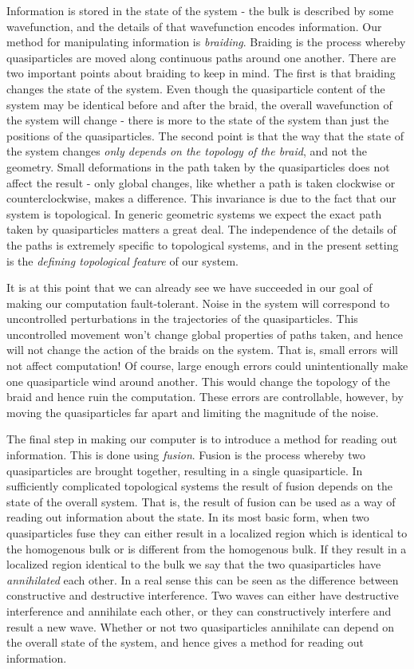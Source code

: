 \documentclass{article}
\theoremstyle{definition}
\numberwithin{figure}{section}
\begin{document}
Information is stored in the state of the system - the bulk is described by some wavefunction, and the details of that wavefunction encodes information. Our method for manipulating information is \textit{braiding}. Braiding is the process whereby quasiparticles are moved along continuous paths around one another. There are two important points about braiding to keep in mind. The first is that braiding changes the state of the system. Even though the quasiparticle content of the system may be identical before and after the braid, the overall wavefunction of the system will change - there is more to the state of the system than just the positions of the quasiparticles. The second point is that the way that the state of the system changes \textit{only depends on the topology of the braid}, and not the geometry. Small deformations in the path taken by the quasiparticles does not affect the result - only global changes, like whether a path is taken clockwise or counterclockwise, makes a difference. This invariance is due to the fact that our system is topological. In generic geometric systems we expect the exact path taken by quasiparticles matters a great deal. The independence of the details of the paths is extremely specific to topological systems, and in the present setting is the \textit{defining topological feature} of our system.

It is at this point that we can already see we have succeeded in our goal of making our computation fault-tolerant. Noise in the system will correspond to uncontrolled perturbations in the trajectories of the quasiparticles. This uncontrolled movement won’t change global properties of paths taken, and hence will not change the action of the braids on the system. That is, small errors will not affect computation! Of course, large enough errors could unintentionally make one quasiparticle wind around another. This would change the topology of the braid and hence ruin the computation. These errors are controllable, however, by moving the quasiparticles far apart and limiting the magnitude of the noise.

The final step in making our computer is to introduce a method for reading out information. This is done using \textit{fusion}. Fusion is the process whereby two quasiparticles are brought together, resulting in a single quasiparticle. In sufficiently complicated topological systems the result of fusion depends on the state of the overall system. That is, the result of fusion can be used as a way of reading out information about the state. In its most basic form, when two quasiparticles fuse they can either result in a localized region which is identical to the homogenous bulk or is different from the homogenous bulk. If they result in a localized region identical to the bulk we say that the two quasiparticles have \textit{annihilated} each other. In a real sense this can be seen as the difference between constructive and destructive interference. Two waves can either have destructive interference and annihilate each other, or they can constructively interfere and result a new wave. Whether or not two quasiparticles annihilate can depend on the overall state of the system, and hence gives a method for reading out information.
\end{document}
